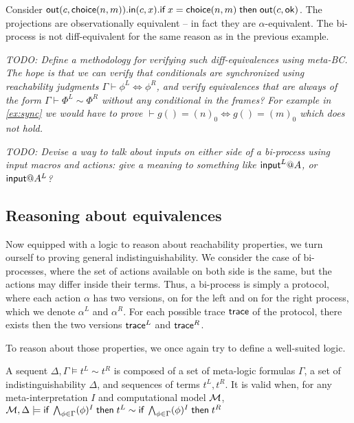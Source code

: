 \begin{example}
  Consider $\mathsf{out}(c,\mathsf{choice}(n,m)).
  \mathsf{in}(c,x).
  \textsf{if}\; x=\mathsf{choice}(n,m) \;\textsf{then}\; \mathsf{out}(c,\mathsf{ok})$.
  The projections are observationally equivalent -- in fact they are
  $\alpha$-equivalent.
  The bi-process is not diff-equivalent for the same reason as in the
  previous example.
\end{example}

\emph{TODO: Define a methodology for verifying such diff-equivalences
using meta-BC. The hope is that we can verify that conditionals are 
synchronized using reachability judgments $\Gamma \vdash \phi^L 
\Leftrightarrow \phi^R$, and verify equivalences that are always of
the form $\Gamma \vdash \Phi^L \sim \Phi^R$ without any conditional
in the frames? For example in \cref{ex:sync} we would have to prove
$\vdash g() = (n)_0 \Leftrightarrow g() = (m)_0$ which does not hold.}

\emph{TODO: Devise a way to talk about inputs on either side of a bi-process
using input macros and actions: give a meaning to something like
$\textsf{input}^L@A$, or $\minp@A^L$?}

\subsection{Reasoning about equivalences}

Now equipped with a logic to reason about reachability properties, we turn 
ourself to proving general indistinguishability. We consider the case of 
bi-processes, where the set of actions available on both side is the same, but 
the actions may differ inside their terms. Thus, a bi-process is simply a 
protocol, where each action $\alpha$ has two versions, on for the left and on 
for the right process, which we denote $\alpha^L$ and $\alpha^R$. For each 
possible trace $\textsf{trace}$ of the protocol, there exists then the two versions 
$\textsf{trace}^L$ and $\textsf{trace}^R$.

To reason about those properties, we once again try to define a well-suited logic.
\begin{definition}
  A sequent $\Delta, \Gamma \vDash t^L \sim t^R $ is composed of a set of meta-logic formulas
  $\Gamma$, a set of indistinguishability $\Delta$, and sequences of terms $t^L,t^R$.
  It is valid when, for any meta-interpretation $I$ and computational model $\mathcal{M}$, $\mathcal{M}, \Delta \models \textsf{if}\; \bigwedge_{\phi \in \Gamma} (\phi)^I \;\textsf{then}\; t^L \sim  \textsf{if}\; \bigwedge_{\phi \in \Gamma} (\phi)^I \;\textsf{then}\; t^R $
\end{definition}


